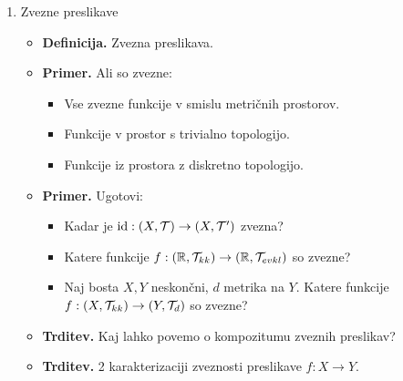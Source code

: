 \begin{enumerate}
    \item Zvezne preslikave
    \begin{itemize}
        \item \textbf{Definicija.} Zvezna preslikava.
        \item \textbf{Primer.} Ali so zvezne:
        \begin{itemize}
            \item Vse zvezne funkcije v smislu metričnih prostorov.
            \item Funkcije v prostor s trivialno topologijo.
            \item Funkcije iz prostora z diskretno topologijo.          
        \end{itemize}
        \item \textbf{Primer.} Ugotovi:
        \begin{itemize}
            \item Kadar je $\operatorname{id}: (X, \mathcal{T}) \to (X, \mathcal{T}')$ zvezna?
            \item Katere funkcije $f: (\mathbb{R}, \mathcal{T}_{kk}) \to (\mathbb{R}, \mathcal{T}_{evkl})$ so zvezne?
            \item Naj bosta $X, Y$ neskončni, $d$ metrika na $Y$. Katere funkcije $f: (X, \mathcal{T}_{kk}) \to (Y, \mathcal{T}_{d})$ so zvezne?
        \end{itemize}
        \item \textbf{Trditev.} Kaj lahko povemo o kompozitumu zveznih preslikav?
        \item \textbf{Trditev.} 2 karakterizaciji zveznosti preslikave $f: X \to Y$.
    \end{itemize}
\end{enumerate}

